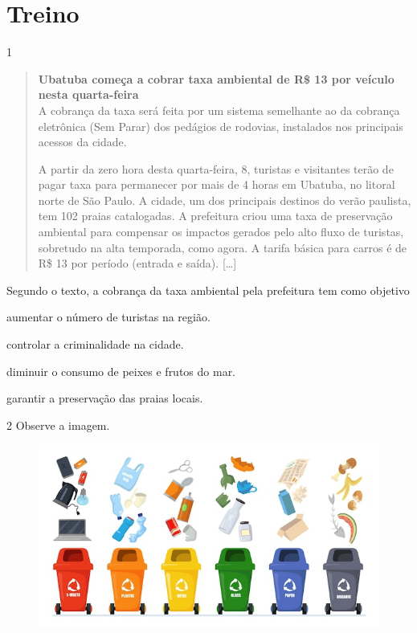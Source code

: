 \pagebreak

\section{Treino}

\num{1}

\begin{quote}
\textbf{Ubatuba começa a cobrar taxa ambiental de R\$ 13 por veículo
nesta quarta-feira}\\
A cobrança da taxa será feita por um sistema semelhante ao da cobrança
eletrônica (Sem Parar) dos pedágios de rodovias, instalados nos
principais acessos da cidade.

A partir da zero hora desta quarta-feira, 8, turistas e visitantes terão
de pagar taxa para permanecer por mais de 4 horas em Ubatuba, no litoral
norte de São Paulo. A cidade, um dos principais destinos do verão
paulista, tem 102 praias catalogadas. A prefeitura criou uma taxa de
preservação ambiental para compensar os impactos gerados pelo alto fluxo
de turistas, sobretudo na alta temporada, como agora. A tarifa básica
para carros é de R\$ 13 por período (entrada e saída). {[}\ldots{}{]}

\end{quote}

Segundo o texto, a cobrança da taxa ambiental pela prefeitura tem como
objetivo

\begin{escolha}
\item aumentar o número de turistas na região.

\item controlar a criminalidade na cidade.

\item diminuir o consumo de peixes e frutos do mar.

\item garantir a preservação das praias locais.
\end{escolha}


\pagebreak
\num{2} Observe a imagem.

\begin{figure}[htpb!]
\centering
\includegraphics[width=.5\textwidth]{./imgs/img37.jpg}
\end{figure}

